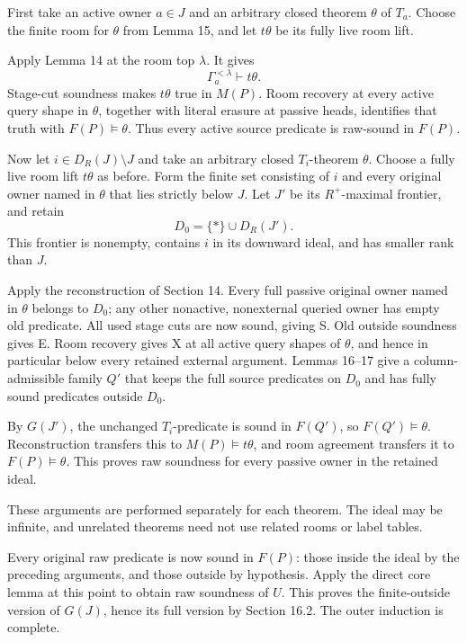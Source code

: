 \documentclass[
  11pt,
  letterpaper,
]{article}
\newcounter{none} %
\begin{document}
First take an active owner \(a\in J\) and an arbitrary closed theorem
\(\theta\) of \(T_a\). Choose the finite room for \(\theta\) from Lemma
15, and let \(t\theta\) be its fully live room lift.

Apply Lemma 14 at the room top \(\lambda\). It gives \[
\Gamma_a^{<\lambda}\vdash t\theta.
\] Stage-cut soundness makes \(t\theta\) true in \(M(P)\). Room recovery
at every active query shape in \(\theta\), together with literal erasure
at passive heads, identifies that truth with \(F(P)\models\theta\). Thus
every active source predicate is raw-sound in \(F(P)\).

Now let \(i\in D_R(J)\setminus J\) and take an arbitrary closed
\(T_i\)-theorem \(\theta\). Choose a fully live room lift \(t\theta\) as
before. Form the finite set consisting of \(i\) and every original owner
named in \(\theta\) that lies strictly below \(J\). Let \(J'\) be its
\(R^+\)-maximal frontier, and retain \[
D_0=\{*\}\cup D_R(J').
\] This frontier is nonempty, contains \(i\) in its downward ideal, and
has smaller rank than \(J\).

Apply the reconstruction of Section 14. Every full passive original
owner named in \(\theta\) belongs to \(D_0\); any other nonactive,
nonexternal queried owner has empty old predicate. All used stage cuts
are now sound, giving S. Old outside soundness gives E. Room recovery
gives X at all active query shapes of \(\theta\), and hence in
particular below every retained external argument. Lemmas 16--17 give a
column-admissible family \(Q'\) that keeps the full source predicates on
\(D_0\) and has fully sound predicates outside \(D_0\).

By \(G(J')\), the unchanged \(T_i\)-predicate is sound in \(F(Q')\), so
\(F(Q')\models\theta\). Reconstruction transfers this to
\(M(P)\models t\theta\), and room agreement transfers it to
\(F(P)\models\theta\). This proves raw soundness for every passive owner
in the retained ideal.

These arguments are performed separately for each theorem. The ideal may
be infinite, and unrelated theorems need not use related rooms or label
tables.

Every original raw predicate is now sound in \(F(P)\): those inside the
ideal by the preceding arguments, and those outside by hypothesis. Apply
the direct core lemma at this point to obtain raw soundness of \(U\).
This proves the finite-outside version of \(G(J)\), hence its full
version by Section 16.2. The outer induction is complete.
\end{document}
